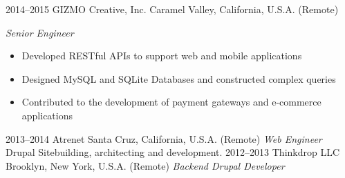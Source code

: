 \documentclass[]{friggeri-cv} %
\begin{document}
\begin{entrylist}
\entry
{2014--2015}
{GIZMO Creative, Inc.}
{Caramel Valley, California, U.S.A. (Remote)}
{\emph{Senior Engineer}
\begin{itemize}
\item Developed RESTful APIs to support web and mobile applications
\item Designed MySQL and SQLite Databases and constructed complex queries
\item Contributed to the development of payment gateways and e-commerce applications
\end{itemize}}
\entry
{2013--2014}
{Atrenet}
{Santa Cruz, California, U.S.A. (Remote)}
{\emph{Web Engineer}
Drupal Sitebuilding, architecting and development.
}
\entry
{2012--2013}
{Thinkdrop LLC}
{Brooklyn, New York, U.S.A. (Remote)}
{ \emph{Backend Drupal Developer }
}
\end{entrylist}
\end{document}
